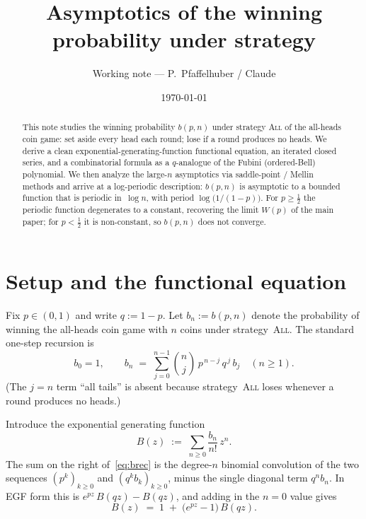 \documentclass[11pt]{article}
\title{Asymptotics of the winning probability under strategy \All}
\author{Working note --- P.\ Pfaffelhuber / Claude}
\date{\today}
\theoremstyle{definition}
\newcommand{\All}{\textsc{All}}
\begin{document}
\maketitle

\begin{abstract}
  This note studies the winning probability
  $b(p,n)$ under strategy \All{} of the all-heads coin game: set aside
  every head each round; lose if a round produces no heads. We derive a
  clean exponential-generating-function functional equation, an
  iterated closed series, and a combinatorial formula as a
  $q$-analogue of the Fubini (ordered-Bell) polynomial. We then
  analyze the large-$n$ asymptotics via saddle-point / Mellin methods
  and arrive at a log-periodic description: $b(p,n)$ is asymptotic to
  a bounded function that is periodic in~$\log n$, with period
  $\log\bigl(1/(1-p)\bigr)$. For $p\ge\tfrac12$ the periodic function
  degenerates to a constant, recovering the limit $W(p)$ of the main
  paper; for $p<\tfrac12$ it is non-constant, so $b(p,n)$ does not
  converge.
\end{abstract}

\section{Setup and the functional equation}\label{sec:setup}

Fix $p\in(0,1)$ and write $q := 1-p$. Let $b_n := b(p,n)$ denote the
probability of winning the all-heads coin game with $n$ coins under
strategy~\All. The standard one-step recursion is
\begin{equation}\label{eq:brec}
  b_0 = 1, \qquad
  b_n \;=\; \sum_{j=0}^{n-1}\binom{n}{j}\,p^{\,n-j}\,q^{\,j}\,b_j
  \quad(n\ge 1).
\end{equation}
(The $j=n$ term ``all tails'' is absent because strategy~\All{} loses
whenever a round produces no heads.)

Introduce the exponential generating function
\[
  B(z) \;:=\; \sum_{n\ge 0}\frac{b_n}{n!}\,z^n.
\]
The sum on the right of~\eqref{eq:brec} is the degree-$n$ binomial
convolution of the two sequences $(p^k)_{k\ge 0}$ and $(q^k b_k)_{k\ge
0}$, minus the single diagonal term $q^n b_n$. In EGF form this is
$e^{pz}\,B(qz)-B(qz)$, and adding in the $n=0$ value gives
\begin{equation}\label{eq:Bfunc}
  \boxed{\;B(z) \;=\; 1 \;+\; \bigl(e^{pz}-1\bigr)\,B(qz).\;}
\end{equation}
\end{document}
